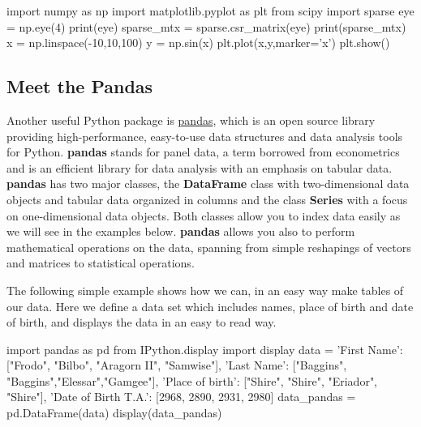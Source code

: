 \documentclass[%
oneside,                 %
final,                   %
10pt]{article}
\begin{document}
\epycod














\bpycod
import numpy as np
import matplotlib.pyplot as plt
from scipy import sparse
eye = np.eye(4)
print(eye)
sparse_mtx = sparse.csr_matrix(eye)
print(sparse_mtx)
x = np.linspace(-10,10,100)
y = np.sin(x)
plt.plot(x,y,marker='x')
plt.show()

\epycod


\subsection{Meet the Pandas}

Another useful Python package is
\href{{https://pandas.pydata.org/}}{pandas}, which is an open source library
providing high-performance, easy-to-use data structures and data
analysis tools for Python. \textbf{pandas} stands for panel data, a term borrowed from econometrics and is an efficient library for data analysis with an emphasis on tabular data.
\textbf{pandas} has two major classes, the \textbf{DataFrame} class with two-dimensional data objects and tabular data organized in columns and the class \textbf{Series} with a focus on one-dimensional data objects. Both classes allow you to index data easily as we will see in the examples below. 
\textbf{pandas} allows you also to perform mathematical operations on the data, spanning from simple reshapings of vectors and matrices to statistical operations. 

The following simple example shows how we can, in an easy way make tables of our data. Here we define a data set which includes names, place of birth and date of birth, and displays the data in an easy to read way. 











\bpycod
import pandas as pd
from IPython.display import display
data = {'First Name': ["Frodo", "Bilbo", "Aragorn II", "Samwise"],
        'Last Name': ["Baggins", "Baggins","Elessar","Gamgee"],
        'Place of birth': ["Shire", "Shire", "Eriador", "Shire"],
        'Date of Birth T.A.': [2968, 2890, 2931, 2980]
        }
data_pandas = pd.DataFrame(data)
display(data_pandas)
\end{document}
